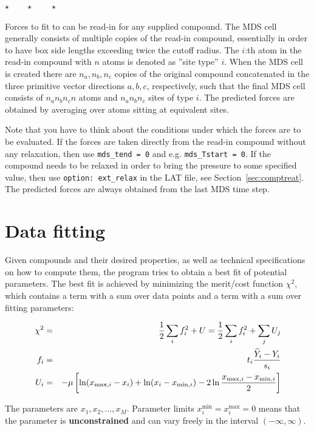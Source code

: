 \documentclass[a4paper,12pt,pdftex,onecolumn]{article}
\newcommand{\stars}{\begin{center}%
\vspace{1em plus 0.5em minus 0.5em}%
$\star \qquad \star \qquad \star$%
\vspace{1em plus 0.5em minus 0.5em}%
\end{center}}
\begin{document}
\stars

Forces to fit to can be read-in for any supplied compound.
The MDS cell generally consists of multiple copies of the read-in compound,
essentially in order to have box side lengths exceeding twice the cutoff radius.
The $i$:th atom in the read-in compound with $n$ atoms is denoted as ''site type'' $i$.
When the MDS cell is created there are $n_a, n_b, n_c$ copies of the original compound
concatenated in the three primitive vector directions $a,b,c$, respectively,
such that the final MDS cell consists of $n_a n_b n_c n$ atoms and
$n_a n_b n_c$ sites of type $i$.
The predicted forces are obtained by averaging over atoms sitting at
equivalent sites.

Note that you have to think about the conditions under which the forces are to be
evaluated. If the forces are taken directly from the read-in compound without
any relaxation, then use \verb+mds_tend = 0+ and e.g. \verb+mds_Tstart = 0+.
If the compound needs to be relaxed in order to bring the pressure to
some specified value, then use \verb+option: ext_relax+ in the LAT file,
see Section~\ref{sec:comptreat}.
The predicted forces are always obtained from the last MDS time step.








\section{Data fitting}

Given compounds and their desired properties, as well as technical specifications
on how to compute them, the program tries to obtain a best fit of potential
parameters. The best fit is achieved by minimizing the merit/cost function
$\chi^2$, which contains a term with a sum over data points and a term with a
sum over fitting parameters:

\begin{eqnarray}
\chi^2 &=& {1 \over 2} \sum_i f_i^2 + U = {1 \over 2} \sum_i f_i^2 + \sum_j U_j \\
f_i &=& t_i {\widetilde{Y}_i - Y_i \over s_i} \\
U_i &=& - \mu \left[ \ln (x_{\mathrm{max},i}-x_i) + \ln (x_i - x_{\mathrm{min},i})
- 2 \ln {x_{\mathrm{max},i} - x_{\mathrm{min},i} \over 2} \right]
\end{eqnarray}

The parameters are $x_1, x_2, \ldots, x_M$.
Parameter limits $x_i^{\mathrm{min}} = x_i^{\mathrm{max}} = 0$
means that the parameter is
\textbf{unconstrained} and can vary freely in the interval $(-\infty, \infty)$.
\end{document}
